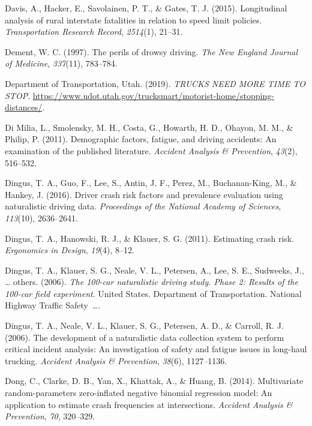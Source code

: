 \documentclass[12pt]{book}
\numberwithin{equation}{chapter}
\begin{document}
\leavevmode\hypertarget{ref-davis2015longitudinal}{}%
Davis, A., Hacker, E., Savolainen, P. T., \& Gates, T. J. (2015). Longitudinal analysis of rural interstate fatalities in relation to speed limit policies. \emph{Transportation Research Record}, \emph{2514}(1), 21--31.

\leavevmode\hypertarget{ref-dement1997perils}{}%
Dement, W. C. (1997). The perils of drowsy driving. \emph{The New England Journal of Medicine}, \emph{337}(11), 783--784.

\leavevmode\hypertarget{ref-utah2019}{}%
Department of Transportation, Utah. (2019). \emph{TRUCKS NEED MORE TIME TO STOP}. \url{https://www.udot.utah.gov/trucksmart/motorist-home/stopping-distances/}.

\leavevmode\hypertarget{ref-di2011demographic}{}%
Di Milia, L., Smolensky, M. H., Costa, G., Howarth, H. D., Ohayon, M. M., \& Philip, P. (2011). Demographic factors, fatigue, and driving accidents: An examination of the published literature. \emph{Accident Analysis \& Prevention}, \emph{43}(2), 516--532.

\leavevmode\hypertarget{ref-dingus2016driver}{}%
Dingus, T. A., Guo, F., Lee, S., Antin, J. F., Perez, M., Buchanan-King, M., \& Hankey, J. (2016). Driver crash risk factors and prevalence evaluation using naturalistic driving data. \emph{Proceedings of the National Academy of Sciences}, \emph{113}(10), 2636--2641.

\leavevmode\hypertarget{ref-dingus2011estimating}{}%
Dingus, T. A., Hanowski, R. J., \& Klauer, S. G. (2011). Estimating crash risk. \emph{Ergonomics in Design}, \emph{19}(4), 8--12.

\leavevmode\hypertarget{ref-dingus2006100}{}%
Dingus, T. A., Klauer, S. G., Neale, V. L., Petersen, A., Lee, S. E., Sudweeks, J., \ldots{} others. (2006). \emph{The 100-car naturalistic driving study. Phase 2: Results of the 100-car field experiment}. United States. Department of Transportation. National Highway Traffic Safety~\ldots{}.

\leavevmode\hypertarget{ref-dingus2006development}{}%
Dingus, T. A., Neale, V. L., Klauer, S. G., Petersen, A. D., \& Carroll, R. J. (2006). The development of a naturalistic data collection system to perform critical incident analysis: An investigation of safety and fatigue issues in long-haul trucking. \emph{Accident Analysis \& Prevention}, \emph{38}(6), 1127--1136.

\leavevmode\hypertarget{ref-dong2014multivariate}{}%
Dong, C., Clarke, D. B., Yan, X., Khattak, A., \& Huang, B. (2014). Multivariate random-parameters zero-inflated negative binomial regression model: An application to estimate crash frequencies at intersections. \emph{Accident Analysis \& Prevention}, \emph{70}, 320--329.
\end{document}

